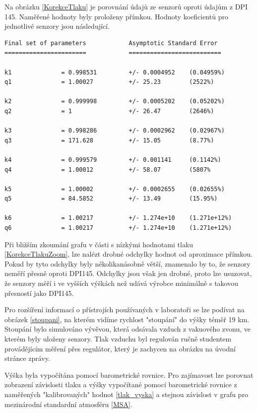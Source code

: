 \documentclass[12pt,a4paper,oneside]{article}
\begin{document}
Na obrázku \ref{KorekceTlaku} je porovnání údajů ze senzorů oproti údajům z DPI 145. Naměřené hodnoty byly proloženy přímkou. Hodnoty koeficientů pro jednotlivé senzory jsou následující.

\newpage

\begin{verbatim}
Final set of parameters            Asymptotic Standard Error
=======================            ==========================

k1              = 0.998531         +/- 0.0004952    (0.04959%)
q1              = 1.00027          +/- 25.23        (2522%)

k2              = 0.999998         +/- 0.0005202    (0.05202%)
q2              = 1                +/- 26.47        (2646%)

k3              = 0.998286         +/- 0.0002962    (0.02967%)
q3              = 171.628          +/- 15.05        (8.77%)

k4              = 0.999579         +/- 0.001141     (0.1142%)
q4              = 1.00012          +/- 58.07        (5807%

k5              = 1.00002          +/- 0.0002655    (0.02655%)
q5              = 84.5852          +/- 13.49        (15.95%)

k6              = 1.00217          +/- 1.274e+10    (1.271e+12%)
q6              = 1.00217          +/- 1.274e+10    (1.271e+12%)
\end{verbatim}

Při bližším zkoumání grafu v části s nízkými hodnotami tlaku \ref{KorekceTlakuZoom}, lze nalézt drobné odchylky hodnot od aproximace přímkou. Pokud by tyto odchylky byly několikanásobně větší, znamenalo by to, že senzory neměří přesně oproti DPI145. Odchylky jsou však jen drobné, proto lze usuzovat, že senzory měří i ve vyšších výškách než udává výrobce minimálně s takovou přesností jako DPI145.

Pro rozšíření informací o přístrojích používaných v laboratoři se lze podívat na obrázek \ref{stoupani}, na kterém vidíme rychlost "stoupání" do výšky téměř 19 km. Stoupání bylo simulováno vývěvou, která odsávala vzduch z vakuového zvonu, ve kterém byly uloženy senzory. Tlak vzduchu byl regulován ručně studentem provádějícím měření přes regulátor, který je zachycen na obrázku na úvodní stránce zprávy.

Výška byla vypočítána pomocí barometrické rovnice. Pro zajímavost lze porovnat zobrazení závislosti tlaku a výšky vypočítané pomocí barometrické rovnice z naměřených "kalibrovaných" hodnot \ref{tlak_vyska} a stejnou závislost v grafu pro mezinárodní standardní atmosféru \ref{MSA}. 
\end{document}
